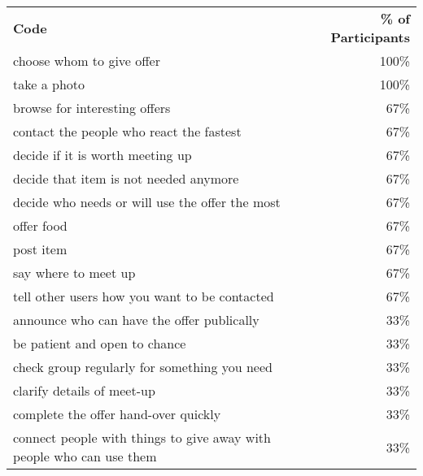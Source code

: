 \begin{longtable}{p{}r}
\textbf{Code}                                                        & \textbf{\% of Participants} \\
choose whom to give offer                                            & 100\%                       \\
take a photo                                                         & 100\%                       \\
browse for interesting offers                                        & 67\%                        \\
contact the people who react the fastest                             & 67\%                        \\
decide if it is worth meeting up                                     & 67\%                        \\
decide that item is not needed anymore                               & 67\%                        \\
decide who needs or will use the offer the most                      & 67\%                        \\
offer food                                                           & 67\%                        \\
post item                                                            & 67\%                        \\
say where to meet up                                                 & 67\%                        \\
tell other users how you want to be contacted                        & 67\%                        \\
announce who can have the offer publically                           & 33\%                        \\
be patient and open to chance                                        & 33\%                        \\
check group regularly for something you need                         & 33\%                        \\
clarify details of meet-up                                           & 33\%                        \\
complete the offer hand-over quickly                                 & 33\%                        \\
connect people with things to give away with people who can use them & 33\%                        \\

\end{longtable}
